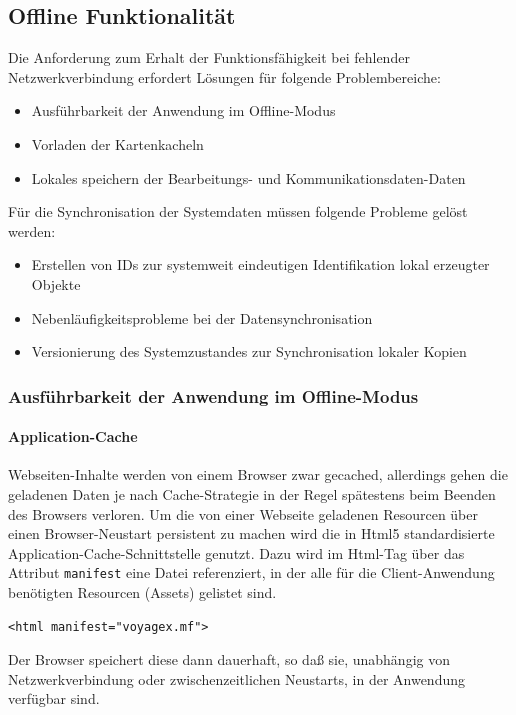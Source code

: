 \subsection{Offline Funktionalität}\label{5_OFFL}
Die Anforderung zum Erhalt der Funktionsfähigkeit bei fehlender Netzwerkverbindung erfordert Lösungen für folgende Problembereiche:
\begin{itemize}
	\item Ausführbarkeit der Anwendung im Offline-Modus
	\item Vorladen der Kartenkacheln
	\item Lokales speichern der Bearbeitungs- und Kommunikationsdaten-Daten
\end{itemize}
\vspace{1ex}\noindent
Für die Synchronisation der Systemdaten müssen folgende Probleme gelöst werden:
\begin{itemize}
	\item Erstellen von IDs zur systemweit eindeutigen Identifikation lokal erzeugter Objekte
	\item Nebenläufigkeitsprobleme bei der Datensynchronisation
	\item Versionierung des Systemzustandes zur Synchronisation lokaler Kopien
\end{itemize}

\subsubsection{Ausführbarkeit der Anwendung im Offline-Modus}
\paragraph{Application-Cache}
Webseiten-Inhalte werden von einem Browser zwar gecached, allerdings gehen die geladenen Daten je nach Cache-Strategie in der Regel spätestens beim Beenden des Browsers verloren. Um die von einer Webseite geladenen Resourcen über einen Browser-Neustart persistent zu machen wird die in Html5 standardisierte Application-Cache-Schnittstelle genutzt. Dazu wird im Html-Tag über das Attribut \texttt{manifest} eine Datei referenziert, in der alle für die Client-Anwendung benötigten Resourcen (Assets) gelistet sind.
\lstset{language=Html}
\begin{lstlisting}[frame=single,numbers=none,xleftmargin=0pt]
<html manifest="voyagex.mf">
\end{lstlisting}%
Der Browser speichert diese dann dauerhaft, so daß sie, unabhängig von Netzwerkverbindung oder zwischenzeitlichen Neustarts, in der Anwendung verfügbar sind.\\
